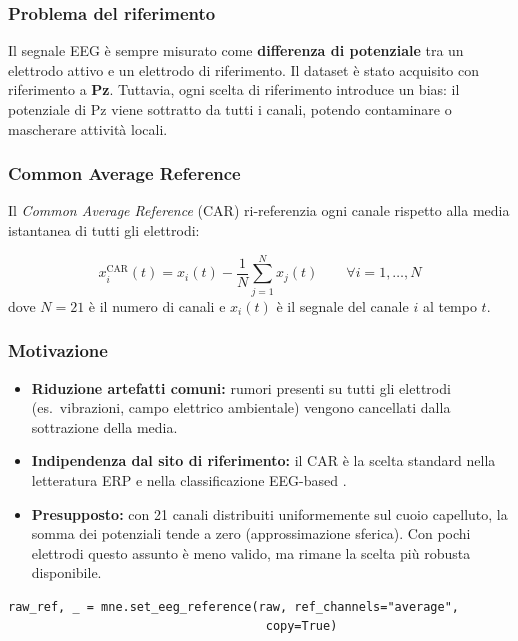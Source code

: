 \documentclass[12pt, a4paper]{article}
\begin{document}
\subsubsection{Problema del riferimento}
Il segnale EEG è sempre misurato come \textbf{differenza di potenziale} tra un elettrodo attivo e un elettrodo di riferimento. Il dataset è stato acquisito con riferimento a \textbf{Pz}. Tuttavia, ogni scelta di riferimento introduce un bias: il potenziale di Pz viene sottratto da tutti i canali, potendo contaminare o mascherare attività locali.

\subsubsection{Common Average Reference}
Il \textit{Common Average Reference} (CAR) ri-referenzia ogni canale rispetto alla media istantanea di tutti gli elettrodi:

\begin{formulabox}
\[
x_i^{\text{CAR}}(t) = x_i(t) - \frac{1}{N} \sum_{j=1}^{N} x_j(t)
\qquad \forall i = 1,\ldots,N
\]
dove $N = 21$ è il numero di canali e $x_i(t)$ è il segnale del canale $i$ al tempo $t$.
\end{formulabox}

\subsubsection{Motivazione}
\begin{itemize}
    \item \textbf{Riduzione artefatti comuni:} rumori presenti su tutti gli elettrodi (es.\ vibrazioni, campo elettrico ambientale) vengono cancellati dalla sottrazione della media.
    \item \textbf{Indipendenza dal sito di riferimento:} il CAR è la scelta standard nella letteratura ERP e nella classificazione EEG-based \cite{nunez1994}.
    \item \textbf{Presupposto:} con 21 canali distribuiti uniformemente sul cuoio capelluto, la somma dei potenziali tende a zero (approssimazione sferica). Con pochi elettrodi questo assunto è meno valido, ma rimane la scelta più robusta disponibile.
\end{itemize}

\begin{lstlisting}[caption={Applicazione CAR in MNE}]
raw_ref, _ = mne.set_eeg_reference(raw, ref_channels="average",
                                    copy=True)
\end{lstlisting}
\end{document}
